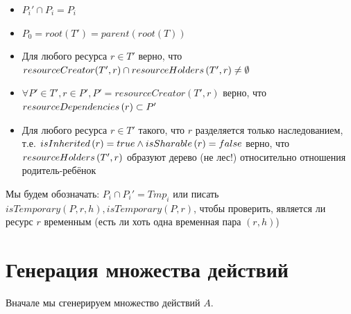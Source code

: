 \begin{itemize}
	\item $P_i' \cap P_i = P_i$
	\item $P_0 = root(T') = parent(root(T))$
	\item Для любого ресурса $r \in T'$ верно, что $resourceCreator(T', r) \cap resourceHolders\left( T', r \right) \neq \emptyset$
	\item $\forall P' \in T', r \in P', P' = resourceCreator(T', r)$ верно, что $resourceDependencies\left( r \right) \subset P'$
	\item Для любого ресурса $r \in T'$ такого, что $r$ разделяется только наследованием, т.е. $isInherited\left( r \right) = true \land isSharable\left( r \right) = false$ верно, что $resourceHolders\left( T', r \right)$ образуют дерево (не лес!) относительно отношения родитель-ребёнок
\end{itemize}

Мы будем обозначать: $P_i \cap P_i' = Tmp_i$ или писать $isTemporary(P, r, h), isTemporary(P, r)$, чтобы проверить, является ли ресурс $r$ временным (есть ли хоть одна временная пара $(r, h)$)

\section{Генерация множества действий}
\label{chap2:sec:actgen}

Вначале мы сгенерируем множество действий $A$.

